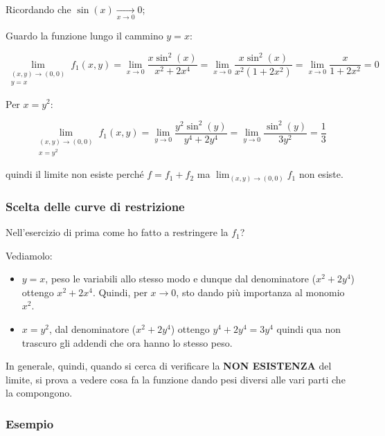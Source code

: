 Ricordando che \(\sin(x) \xrightarrow[x \to 0]{} 0\);

Guardo la funzione lungo il cammino \(y=x\):

\[
    \lim_{ \begin{smallmatrix}(x,y) \to (0,0) \\ y=x \end{smallmatrix} } f_1(x,y) = \lim_{ x \to 0 } \frac{x\sin^{2}(x)}{x^{2}+2x^{4}} = \lim_{ x \to 0 } \frac{x\sin^{2}(x)}{x^{2}(1+2x^{2})} = \lim_{ x \to 0 } \frac{x}{1+2x^2} = 0
\]

Per \(x = y^{2}\):

\[
    \lim_{ \begin{smallmatrix}(x,y) \to (0,0) \\ x=y^2 \end{smallmatrix} } f_1(x,y)  = \lim_{ y \to 0 } \frac{y^{2}\sin^{2}(y)}{y^{4}+2y^{4}} = \lim_{ y \to 0 } \frac{\sin^{2}(y)}{3y^{2}}  = \frac{1}{3}
\]

quindi il limite non esiste perché \(f= f_1+f_2\) ma \(\lim_{ (x,y) \to (0,0) } f_1\) non esiste.

\pagebreak
\subsubsection{Scelta delle curve di restrizione}

Nell'esercizio di prima come ho fatto a restringere la \(f_1\)?

Vediamolo:

\begin{itemize}
    \item \(y=x\), peso le variabili allo stesso modo e dunque dal denominatore (\(x^{2}+2y^{4}\)) ottengo \(x^{2}+2x^{4}\). Quindi, per \(x \rightarrow 0\), sto dando più importanza al monomio \(x^2\).
    \item \(x=y^{2}\), dal denominatore (\(x^{2}+2y^{4}\)) ottengo \(y^{4}+2y^{4} = 3y^{4}\) quindi qua non trascuro gli addendi che ora hanno lo stesso peso.
\end{itemize}

In generale, quindi, quando si cerca di verificare la \textbf{NON ESISTENZA} del limite, si prova a vedere cosa fa la funzione dando pesi diversi alle vari parti che la compongono.

\subsubsection*{Esempio}

